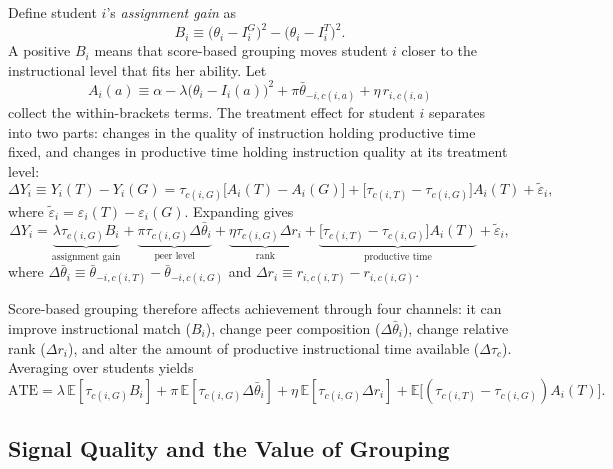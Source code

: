 \documentclass[11pt]{article}
\newcommand{\E}{\mathbb{E}}
\begin{document}
Define student $i$'s \emph{assignment gain} as
\begin{equation}
\label{eq:Bi}
B_i \equiv \big(\theta_i - I_i^G\big)^2 - \big(\theta_i - I_i^T\big)^2.
\end{equation}
A positive $B_i$ means that score-based grouping moves student $i$ closer to the instructional level that fits her ability. Let
\begin{equation}
A_i(a) \equiv \alpha - \lambda\big(\theta_i - I_i(a)\big)^2 + \pi\bar{\theta}_{-i,c(i,a)} + \eta\, r_{i,c(i,a)}
\end{equation}
collect the within-brackets terms. The treatment effect for student $i$ separates into two parts: changes in the quality of instruction holding productive time fixed, and changes in productive time holding instruction quality at its treatment level:
\begin{equation}
\label{eq:decomp}
\Delta Y_i \equiv Y_i(T) - Y_i(G) = \tau_{c(i,G)}\big[A_i(T) - A_i(G)\big] + \big[\tau_{c(i,T)} - \tau_{c(i,G)}\big] A_i(T) + \tilde{\varepsilon}_i,
\end{equation}
where $\tilde{\varepsilon}_i = \varepsilon_i(T) - \varepsilon_i(G)$. Expanding gives
\begin{equation}
\label{eq:decomp_full}
\Delta Y_i = \underbrace{\lambda\tau_{c(i,G)} B_i}_{\text{assignment gain}} + \underbrace{\pi\tau_{c(i,G)}\Delta\bar{\theta}_i}_{\text{peer level}} + \underbrace{\eta\tau_{c(i,G)}\Delta r_i}_{\text{rank}} + \underbrace{\big[\tau_{c(i,T)} - \tau_{c(i,G)}\big] A_i(T)}_{\text{productive time}} + \tilde{\varepsilon}_i,
\end{equation}
where $\Delta\bar{\theta}_i \equiv \bar{\theta}_{-i,c(i,T)} - \bar{\theta}_{-i,c(i,G)}$ and $\Delta r_i \equiv r_{i,c(i,T)} - r_{i,c(i,G)}$.

Score-based grouping therefore affects achievement through four channels: it can improve instructional match ($B_i$), change peer composition ($\Delta\bar{\theta}_i$), change relative rank ($\Delta r_i$), and alter the amount of productive instructional time available ($\Delta\tau_c$). Averaging over students yields
\begin{equation}
\label{eq:ate}
\text{ATE} = \lambda\,\E[\tau_{c(i,G)} B_i] + \pi\,\E[\tau_{c(i,G)}\Delta\bar{\theta}_i] + \eta\,\E[\tau_{c(i,G)}\Delta r_i] + \E\!\big[(\tau_{c(i,T)} - \tau_{c(i,G)})A_i(T)\big].
\end{equation}

\subsection{Signal Quality and the Value of Grouping}
\end{document}
